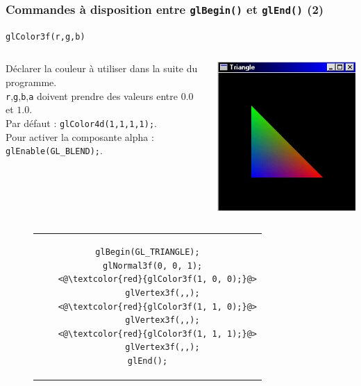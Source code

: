 \documentclass{beamer}
\begin{document}
\begin{frame}[fragile]
\frametitle{Commandes à disposition entre \verb!glBegin()! et \verb!glEnd()! (2)}
	\begin{block}{\verb!glColor3f(r,g,b)!}
		\begin{columns}
			\begin{column}{0.8\textwidth}
				Déclarer la couleur à utiliser dans la suite du programme.\\
				\verb!r!,\verb!g!,\verb!b!,\verb!a! doivent prendre des valeurs entre $0.0$ et $1.0$.\\
				Par défaut : \verb!glColor4d(1,1,1,1);!.\\
				Pour activer la composante alpha : \verb!glEnable(GL_BLEND);!.
			\end{column}
			\begin{column}{0.15\textwidth}
				\includegraphics[width=\textwidth]{img/triang}
			\end{column}
		\end{columns}
		\begin{figure}
			\centering
			\begin{tabular}{c}
				\begin{lstlisting}[basicstyle=\small]
glBegin(GL_TRIANGLE);
  glNormal3f(0, 0, 1);
    <@\textcolor{red}{glColor3f(1, 0, 0);}@>
      glVertex3f(,,);
    <@\textcolor{red}{glColor3f(1, 1, 0);}@>
      glVertex3f(,,);
    <@\textcolor{red}{glColor3f(1, 1, 1);}@>
      glVertex3f(,,);
glEnd();
				\end{lstlisting}
			\end{tabular}
		\end{figure}
	\end{block}
\end{frame}
\end{document}
